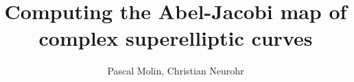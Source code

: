 \documentclass[11pt,a4paper]{article}
\title{Computing the Abel-Jacobi map of complex superelliptic curves}
\author{Pascal Molin, Christian Neurohr}
\def\biblio{}
\begin{document}
\def\biblio{}

\maketitle

\tableofcontents
\newpage

















\newpage


\end{document}
